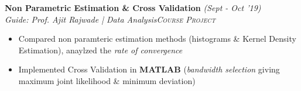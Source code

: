 \documentclass{article}
\begin{document}
\vspace{-5pt}
\textbf{Non Parametric Estimation \& Cross Validation} \hfill{\sl \small (Sept - Oct '19)}\\{\it Guide: Prof. Ajit Rajwade | Data Analysis}\hfill{\sl \small \textsc{Course Project}}\\
\vspace{-19pt}
\begin{itemize}[itemsep = -1 mm, leftmargin=*]
  \item Compared non paramteric estimation methods (histograms \& Kernel Density Estimation), anaylzed the \textit{rate of convergence}
    \item Implemented Cross Validation in \textbf{MATLAB} (\textsl{bandwidth selection} giving maximum joint likelihood \& minimum deviation) %
\end{itemize}
\end{document}
